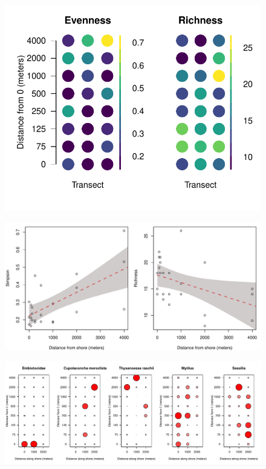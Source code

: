 \documentclass[11pt,letterpaper]{article} %
\begin{document}
\begin{figure}[H] %
  \centering
    \includegraphics[width=1\textwidth]{diversity.pdf}
    \caption{\protect}
  \label{diversity}
\end{figure}

\begin{figure}[H] %
  \centering
    \includegraphics[width=1\textwidth]{diversity_distance.pdf}
    \caption{\protect}
  \label{diversity_distance}
\end{figure}
\pagebreak

\begin{figure}[H] %
  \centering
    \includegraphics[width=1\textwidth]{otu_in_space_select.pdf}
    \caption{\protect}
  \label{otu_in_space_select}
\end{figure}
\end{document}
